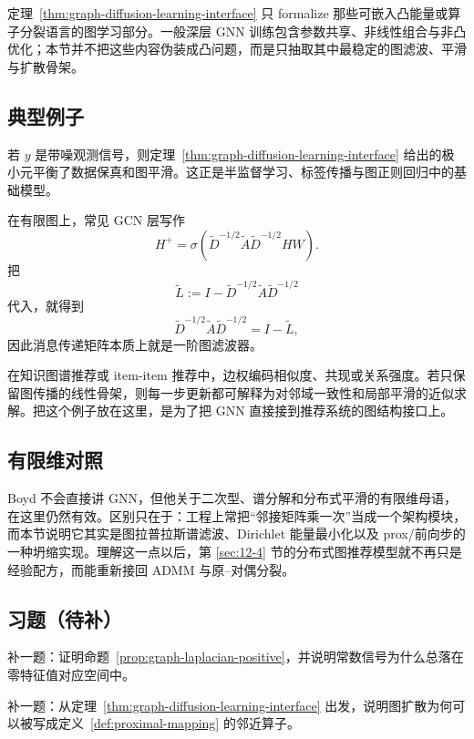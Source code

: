 \begin{remark}
定理~\ref{thm:graph-diffusion-learning-interface} 只 formalize 那些可嵌入凸能量或算子分裂语言的图学习部分。一般深层 GNN 训练包含参数共享、非线性组合与非凸优化；本节并不把这些内容伪装成凸问题，而是只抽取其中最稳定的图滤波、平滑与扩散骨架。
\end{remark}

\subsection{典型例子}

\begin{example}[图平滑最小化]
若 $y$ 是带噪观测信号，则定理~\ref{thm:graph-diffusion-learning-interface} 给出的极小元平衡了数据保真和图平滑。这正是半监督学习、标签传播与图正则回归中的基础模型。
\end{example}

\begin{example}[邻接矩阵与归一化拉普拉斯的有限维坍缩]
在有限图上，常见 GCN 层写作
\[
H^{+}=\sigma(\widetilde D^{-1/2}\widetilde A\widetilde D^{-1/2}HW).
\]
把
\[
\widetilde L:=I-\widetilde D^{-1/2}\widetilde A\widetilde D^{-1/2}
\]
代入，就得到
\[
\widetilde D^{-1/2}\widetilde A\widetilde D^{-1/2}=I-\widetilde L,
\]
因此消息传递矩阵本质上就是一阶图滤波器。
\end{example}

\begin{example}
在知识图谱推荐或 item-item 推荐中，边权编码相似度、共现或关系强度。若只保留图传播的线性骨架，则每一步更新都可解释为对邻域一致性和局部平滑的近似求解。把这个例子放在这里，是为了把 GNN 直接接到推荐系统的图结构接口上。
\end{example}

\subsection*{有限维对照}

Boyd 不会直接讲 GNN，但他关于二次型、谱分解和分布式平滑的有限维母语，在这里仍然有效。区别只在于：工程上常把“邻接矩阵乘一次”当成一个架构模块，而本节说明它其实是图拉普拉斯谱滤波、Dirichlet 能量最小化以及 prox/前向步的一种坍缩实现。理解这一点以后，第 \ref{sec:12-4} 节的分布式图推荐模型就不再只是经验配方，而能重新接回 ADMM 与原--对偶分裂。

\subsection*{习题（待补）}

\begin{exercise}[图拉普拉斯正性占位]
补一题：证明命题~\ref{prop:graph-laplacian-positive}，并说明常数信号为什么总落在零特征值对应空间中。
\end{exercise}

\begin{exercise}
补一题：从定理~\ref{thm:graph-diffusion-learning-interface} 出发，说明图扩散为何可以被写成定义~\ref{def:proximal-mapping} 的邻近算子。
\end{exercise}
